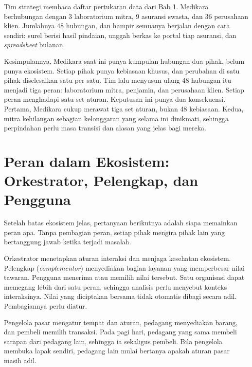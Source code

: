 \begin{kasus}[title={Kasus Medikara Health: Sudahkah Medikara Punya Ekosistem?}]
Tim strategi membaca daftar pertukaran data dari Bab 1. Medikara berhubungan dengan 3 laboratorium
mitra, 9 asuransi swasta, dan 36 perusahaan klien. Jumlahnya 48 hubungan, dan hampir semuanya
berjalan dengan cara sendiri: surel berisi hasil pindaian, unggah berkas ke portal tiap asuransi,
dan \textit{spreadsheet} bulanan.

Kesimpulannya, Medikara saat ini punya kumpulan hubungan dua pihak, belum punya ekosistem. Setiap
pihak punya kebiasaan khusus, dan perubahan di satu pihak diselesaikan satu per satu. Tim lalu menyusun ulang 48 hubungan itu menjadi tiga peran: laboratorium mitra, penjamin, dan
perusahaan klien. Setiap peran menghadapi satu set aturan. Keputusan ini punya dua konsekuensi.
Pertama, Medikara cukup merawat tiga set aturan, bukan 48 kebiasaan. Kedua, mitra kehilangan
sebagian kelonggaran yang selama ini dinikmati, sehingga perpindahan perlu masa transisi dan alasan
yang jelas bagi mereka.
\end{kasus}

\section{Peran dalam Ekosistem: Orkestrator, Pelengkap, dan Pengguna}

Setelah batas ekosistem jelas, pertanyaan berikutnya adalah siapa memainkan peran apa. Tanpa
pembagian peran, setiap pihak mengira pihak lain yang bertanggung jawab ketika terjadi masalah.

Orkestrator menetapkan aturan interaksi dan menjaga kesehatan ekosistem. Pelengkap
(\textit{complementor}) menyediakan bagian layanan yang memperbesar nilai tawaran. Pengguna menerima
atau memilih nilai tersebut. Satu organisasi dapat memegang lebih dari satu peran, sehingga analisis
perlu menyebut konteks interaksinya. Nilai yang diciptakan bersama tidak otomatis dibagi secara
adil. Pembagiannya perlu diatur.

Pengelola pasar mengatur tempat dan aturan, pedagang menyediakan barang, dan pembeli memilih
transaksi. Pada pagi hari, pedagang yang sama membeli sarapan dari pedagang lain, sehingga ia
sekaligus pembeli. Bila pengelola membuka lapak sendiri, pedagang lain mulai bertanya apakah aturan
pasar masih adil.

